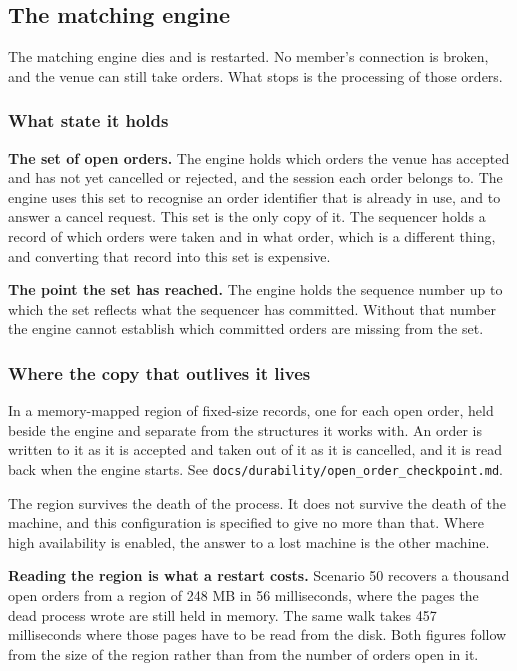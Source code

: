\subsection{The matching engine}
\label{sec:ha:disabled:me}

The matching engine dies and is restarted. No member's connection is broken, and
the venue can still take orders. What stops is the processing of those orders.

\subsubsection{What state it holds}
\label{sec:ha:disabled:me:state}

\textbf{The set of open orders.} The engine holds which orders the venue has
accepted and has not yet cancelled or rejected, and the session each order
belongs to. The engine uses this set to recognise an order identifier that is
already in use, and to answer a cancel request. This set is the only copy of it.
The sequencer holds a record of which orders were taken and in what order, which
is a different thing, and converting that record into this set is expensive.

\textbf{The point the set has reached.} The engine holds the sequence number up
to which the set reflects what the sequencer has committed. Without that number
the engine cannot establish which committed orders are missing from the set.

\subsubsection{Where the copy that outlives it lives}
\label{sec:ha:disabled:me:durable}

In a memory-mapped region of fixed-size records, one for each open order, held
beside the engine and separate from the structures it works with. An order is
written to it as it is accepted and taken out of it as it is cancelled, and it is
read back when the engine starts. See
\texttt{docs/durability/open\_order\_checkpoint.md}.

The region survives the death of the process. It does not survive the death of
the machine, and this configuration is specified to give no more than that.
Where high availability is enabled, the answer to a lost machine is the other
machine.

\textbf{Reading the region is what a restart costs.} Scenario 50 recovers a
thousand open orders from a region of 248 MB in 56 milliseconds, where the pages
the dead process wrote are still held in memory. The same walk takes 457
milliseconds where those pages have to be read from the disk. Both figures follow
from the size of the region rather than from the number of orders open in it.

